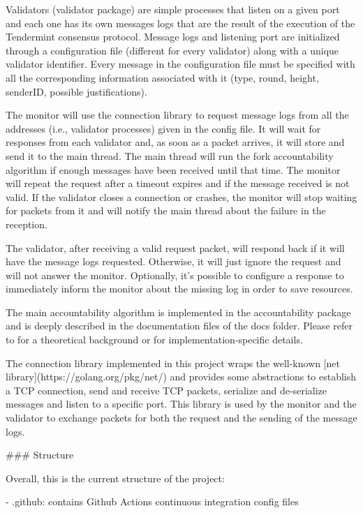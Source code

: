 \documentclass[a4paper,11pt,oneside]{report}
\begin{document}
\begin{markdown}
Validators (validator package) are simple processes that listen on a given port and each one has its own messages logs that are the result of the execution of the Tendermint consensus protocol. Message logs and listening port are initialized through a configuration file (different for every validator) along with a unique validator identifier.
Every message in the configuration file must be specified with all the corresponding information associated with it (type, round, height, senderID, possible justifications).

The monitor will use the connection library to request message logs from all the addresses (i.e., validator processes) given in the config file. It will wait for responses from each validator and, as soon as a packet arrives, it will store and send it to the main thread. The main thread will run the fork accountability algorithm if enough messages have been received until that time.
The monitor will repeat the request after a timeout expires and if the message received is not valid. If the validator closes a connection or crashes, the monitor will stop waiting for packets from it and will notify the main thread about the failure in the reception.

The validator, after receiving a valid request packet, will respond back if it will have the message logs requested. Otherwise, it will just ignore the request and will not answer the monitor. Optionally, it's possible to configure a response to immediately inform the monitor about the missing log in order to save resources.

The main accountability algorithm is implemented in the accountability package and is deeply described in the documentation files of the docs folder. Please refer to for a theoretical background or for implementation-specific details.

The connection library implemented in this project wraps the well-known [net library](https://golang.org/pkg/net/) and provides some abstractions to establish a TCP connection, send and receive TCP packets, serialize and de-serialize messages and listen to a specific port.
This library is used by the monitor and the validator to exchange packets for both the request and the sending of the message logs.

### Structure

Overall, this is the current structure of the project:
    
- .github: contains Github Actions continuous integration config files


\end{markdown}
\end{document}
